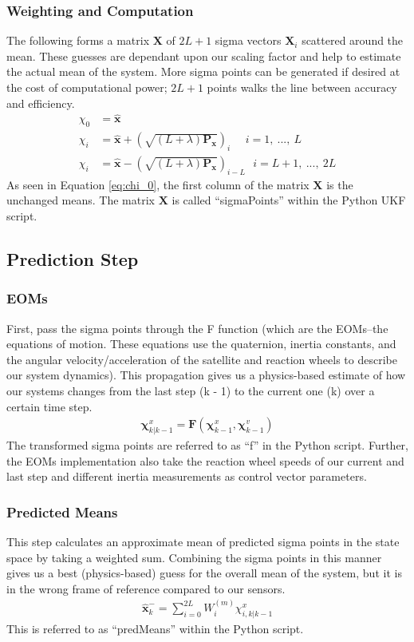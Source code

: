 \documentclass{article}
\newcommand{\x}{\mathbf{x}}
\newcommand{\X}{\mathbf{X}}
\newcommand{\Px}{\mathbf{P_{\x}}}
\newcommand{\chivec}{\mathbf{\chi}}
\newcommand{\F}{\mathbf{F}}
\begin{document}
\subsubsection{Weighting and Computation}
The following forms a matrix $\X$ of $2L + 1$ sigma vectors $\X_i$ scattered around the mean. These guesses are dependant upon our scaling factor and help to estimate the actual mean of the system. More sigma points can be generated if desired at the cost of computational power; $2L + 1$ points walks the line between accuracy and efficiency. 
\begin{align}
    \chi_0 &= \hat{\x} \label{eq:chi_0}\\
    \chi_i &= \hat{\x} + \left( \sqrt{(L + \lambda) \Px}\right)_i ~~~~~~ i = 1,~...,~L \\
    \chi_i &= \hat{\x} - \left( \sqrt{(L + \lambda) \Px}\right)_{i-L} ~~~ i = L+1,~...,~2L
\end{align}
As seen in Equation \ref{eq:chi_0}, the first column of the matrix $\X$ is the unchanged means. The matrix $\X$ is called ``sigmaPoints'' within the Python UKF script. 

\subsection{Prediction Step}
\subsubsection{EOMs}
First, pass the sigma points through the F function (which are the EOMs--the equations of motion. These equations use the quaternion, inertia constants, and the angular velocity/acceleration of the satellite and reaction wheels to describe our system dynamics). This propagation gives us a physics-based estimate of how our systems changes from the last step (k - 1) to the current one (k) over a certain time step. 
\begin{align}
    \chivec_{k|k-1}^{x} = \F(\chivec_{k-1}^{x}, \chivec_{k-1}^{v}) \label{eq:eoms}
\end{align}
The transformed sigma points are referred to as ``f'' in the Python script. Further, the EOMs implementation also take the reaction wheel speeds of our current and last step and different inertia measurements as control vector parameters.

\subsubsection{Predicted Means}
This step calculates an approximate mean of predicted sigma points in the state space by taking a weighted sum. Combining the sigma points in this manner gives us a best (physics-based) guess for the overall mean of the system, but it is in the wrong frame of reference compared to our sensors. 
\begin{align}
    \hat{\x}_k^{-} = \sum_{i = 0}^{2L} W_i^{(m)} \chi^{x}_{i, k|k-1} \label{eq:predMeans}
\end{align}
This is referred to as ``predMeans'' within the Python script.
\end{document}
